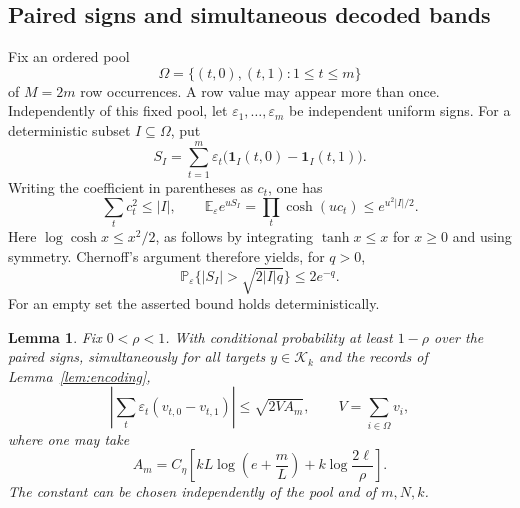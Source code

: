 \documentclass[11pt]{article}
\newtheorem{lemma}[theorem]{Lemma}
\theoremstyle{remark}
\newcommand{\E}{\mathbb E}
\newcommand{\Prob}{\mathbb P}
\newcommand{\1}{\mathbf 1}
\newcommand{\K}{\mathcal K}
\begin{document}
\subsection{Paired signs and simultaneous decoded bands}

Fix an ordered pool
\[
 \Omega=\{(t,0),(t,1):1\leq t\leq m\}
\]
of $M=2m$ row occurrences. A row value may appear more than once.
Independently of this fixed pool, let $\varepsilon_1,\ldots,
\varepsilon_m$ be independent uniform signs. For a deterministic subset
$I\subseteq\Omega$, put
\[
 S_I=\sum_{t=1}^m\varepsilon_t
 \big(\1_I(t,0)-\1_I(t,1)\big).
\]
Writing the coefficient in parentheses as $c_t$, one has
\begin{equation}\label{eq:varianceproxy}
 \sum_t c_t^2\leq |I|,
 \qquad
 \E_\varepsilon e^{uS_I}
 =\prod_t\cosh(uc_t)\leq e^{u^2|I|/2}.
\end{equation}
Here $\log\cosh x\leq x^2/2$, as follows by integrating
$\tanh x\leq x$ for $x\geq0$ and using symmetry. Chernoff's argument
therefore yields, for $q>0$,
\begin{equation}\label{eq:bandtail}
 \Prob_\varepsilon\{|S_I|>\sqrt{2|I|q}\}\leq 2e^{-q}.
\end{equation}
For an empty set the asserted bound holds deterministically.

\begin{lemma}\label{lem:uniformsigned}
Fix $0<\rho<1$. With conditional probability at least $1-\rho$ over the
paired signs, simultaneously for all targets $y\in\K_k$ and the records
of Lemma~\ref{lem:encoding},
\begin{equation}\label{eq:signedv}
 \left|\sum_t\varepsilon_t(v_{t,0}-v_{t,1})\right|
 \leq\sqrt{2V A_m},\qquad V=\sum_{i\in\Omega}v_i,
\end{equation}
where one may take
\begin{equation}\label{eq:Am}
 A_m=C_\eta\left[
 kL\log\left(e+\frac mL\right)+k\log\frac{2\ell}{\rho}
 \right].
\end{equation}
The constant can be chosen independently of the pool and of $m,N,k$.
\end{lemma}
\end{document}
